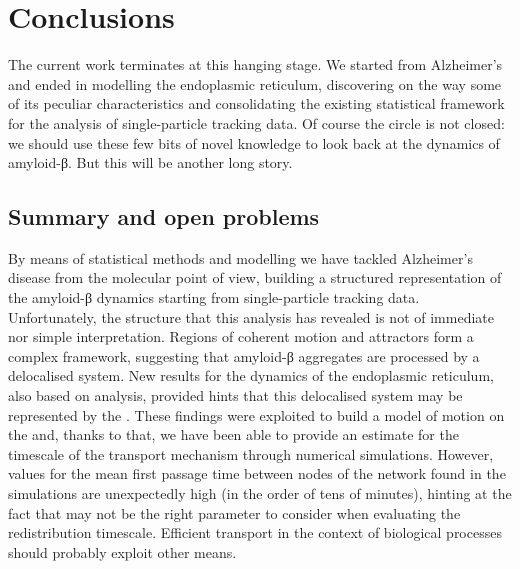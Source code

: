 
\chapter{Conclusions}

The current work terminates at this hanging stage. We started from Alzheimer's and ended in modelling the endoplasmic reticulum, discovering on the way some of its peculiar characteristics and consolidating the existing statistical framework for the analysis of single-particle tracking data. Of course the circle is not closed: we should use these few bits of novel knowledge to look back at the dynamics of amyloid-β. But this will be another long story.

\section{Summary and open problems}

By means of statistical methods and modelling we have tackled Alzheimer's disease from the molecular point of view, building a structured representation of the amyloid-β dynamics starting from single-particle tracking data.
Unfortunately, the structure that this analysis has revealed is not of immediate nor simple interpretation.
Regions of coherent motion and attractors form a complex framework, suggesting that amyloid-β aggregates are processed by a delocalised system.
New results for the dynamics of the endoplasmic reticulum, also based on  analysis, provided hints that this delocalised system may be represented by the .
These findings were exploited to build a model of motion on the  and, thanks to that, we have been able to provide an estimate for the timescale of the  transport mechanism through numerical simulations.
However, values for the mean first passage time between nodes of the network found in the simulations are unexpectedly high (in the order of tens of minutes), hinting at the fact that  may not be the right parameter to consider when evaluating the redistribution timescale. Efficient transport in the context of biological processes should probably exploit other means.

